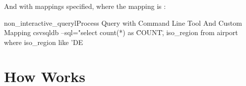 And with mappings specified, where the mapping is :

\begin{ShellListing}{non_interactive_queryl}{Process Query with Command Line Tool And Custom Mapping}
csvsqldb --sql="select count(*) as \"COUNT\", iso_region from airport where iso_region like 'DE%
\end{ShellListing}

\section{How \csvsqldb{} Works}
